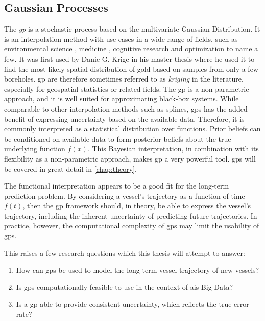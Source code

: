\subsection{Gaussian Processes}
The \textit{\acrfull{gp}} is a stochastic process based on the multivariate Gaussian Distribution. It is an interpolation method with use cases in a wide range of fields, such as environmental science \cite{kriging}, medicine \cite{medical_gp,medicine_gp_2}, cognitive research \cite{gp_cognitive} and optimization \cite{brochu2010tutorial} to name a few. It was first used by Danie G. Krige in his master thesis \cite{krige1951statistical} where he used it to find the most likely spatial distribution of gold based on samples from only a few boreholes. \acrshort{gp} are therefore sometimes referred to as \textit{kriging} in the literature, especially for geospatial statistics or related fields. 
The \acrshort{gp} is a non-parametric approach, and it is well suited for approximating black-box systems. While comparable to other interpolation methods such as splines, \acrshort{gp}s has the added benefit of expressing uncertainty based on the available data. Therefore, it is commonly interpreted as a statistical distribution over functions. Prior beliefs can be conditioned on available data to form posterior beliefs about the true underlying function $f(x)$. This Bayesian interpretation, in combination with its flexibility as a non-parametric approach, makes \acrshort{gp} a very powerful tool. \acrshort{gp}s will be covered in great detail in \cref{chap:theory}. 

The functional interpretation appears to be a good fit for the long-term prediction problem. By considering a vessel's trajectory as a function of time $f(t)$, then the \acrshort{gp} framework should, in theory, be able to express the vessel's trajectory, including the inherent uncertainty of predicting future trajectories. In practice, however, the computational complexity of \acrshort{gp}s may limit the usability of \acrshort{gp}s.  

This raises a few research questions which this thesis will attempt to answer:
\begin{enumerate}
	\item How can \acrshort{gp}s be used to model the long-term vessel trajectory of new vessels?   
	\item Is \acrshort{gp}s computationally feasible to use in the context of \acrshort{ais} Big Data?
	\item Is a \acrshort{gp} able to provide consistent uncertainty, which reflects the true error rate?
\end{enumerate}

